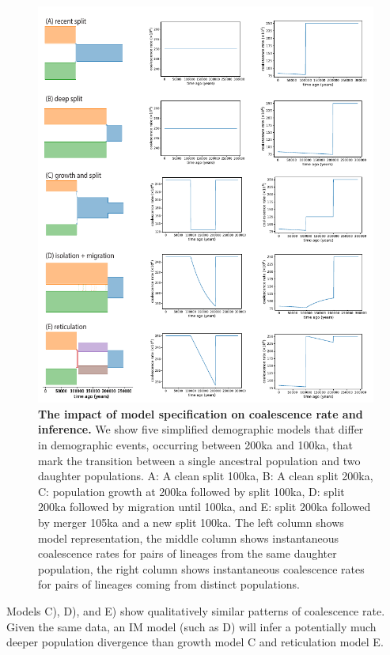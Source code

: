 \documentclass[]{article}
\begin{document}
\begin{figure}[ht!]
    \centering
    \includegraphics{figures/toy_models/toy_model_combo}
    \caption{
        \textbf{The impact of model specification on coalescence rate and
        inference.} We show five simplified demographic models that differ in
        demographic events, occurring between 200ka and 100ka, that mark the
        transition between a single ancestral population and two daughter
        populations. A: A clean split 100ka, B: A clean split 200ka, C:
        population growth at 200ka followed by split 100ka, D: split 200ka
        followed by migration until 100ka, and E: split 200ka followed by
        merger 105ka and a new split 100ka. The left column shows model
        representation, the middle column shows instantaneous coalescence rates
        for pairs of lineages from the same daughter population, the right
        column shows instantaneous coalescence rates for pairs of lineages
        coming from distinct populations.  
    }
    \label{fig:toymodels}
\end{figure}

Models C), D), and E) show qualitatively similar patterns of coalescence rate. 
Given the same data, an IM model (such as D) will infer a potentially much 
deeper population divergence than growth model C and reticulation model E.
\end{document}
